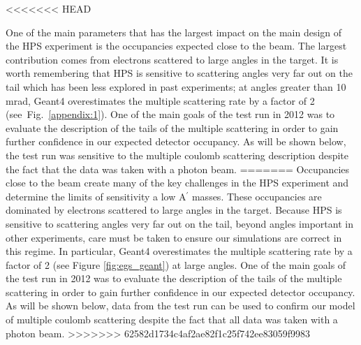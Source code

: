 <<<<<<< HEAD

One of the main parameters that has the 
largest impact on the main design of the HPS experiment is the occupancies expected 
close to the beam.  The largest contribution comes from electrons scattered to large angles 
in the target. It is worth remembering that HPS is sensitive to scattering angles very far out 
on the tail which has been less explored in past experiments; at angles greater than 10 mrad, 
Geant4 overestimates the multiple scattering rate by a factor of 2 (see~Fig.~\ref{appendix:1}). One of the main goals of the 
test run in 2012 was to evaluate the description of the tails of the multiple scattering in order 
to gain further confidence in our expected detector occupancy. As will be shown below, the 
test run was sensitive to the multiple coulomb scattering description despite the fact that 
the data was taken with a photon beam.
=======
Occupancies close to the beam create many of the key challenges in the HPS experiment
and determine the limits of sensitivity a low A$^\prime$ masses.
These occupancies are dominated by electrons scattered to large angles 
in the target. Because HPS is sensitive to scattering angles very far out 
on the tail, beyond angles important in other experiments, care must be taken
to ensure our simulations are correct in this regime.  In particular,
Geant4 overestimates the multiple scattering rate by a factor of 2 (see Figure \ref{fig:egs_geant}) at large angles. 
One of the main goals of the test run in 2012 was to evaluate the description of the tails of the multiple scattering in order 
to gain further confidence in our expected detector occupancy. As will be shown below, data from the 
test run can be used to confirm our model of multiple coulomb scattering despite the fact that 
all data was taken with a photon beam.
>>>>>>> 62582d1734c4af2ae82f1c25f742ee83059f9983


